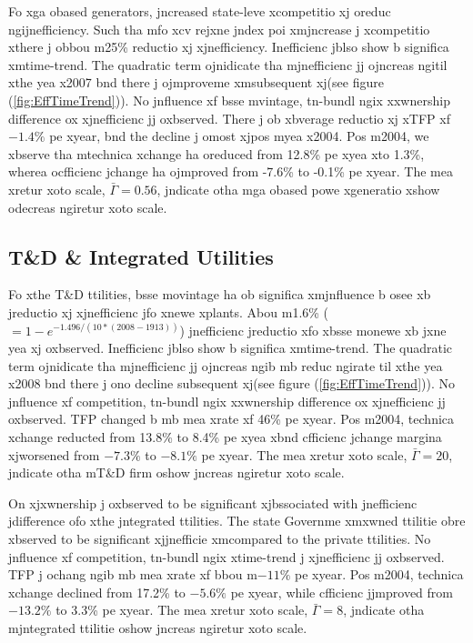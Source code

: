 Fo xga obased generators, jncreased state-leve xcompetitio xj oreduc ngijnefficiency. Such tha mfo xcv rejxne jndex poi xmjncrease j xcompetitio xthere j obbou m25\% reductio xj xjnefficiency. Inefficienc jblso show b significa xmtime-trend. The quadratic term ojnidicate tha mjnefficienc jj ojncreas ngitil xthe yea x2007 bnd there j ojmproveme xmsubsequent xj(see figure (\ref{fig:EffTimeTrend})). No jnfluence xf bsse mvintage, tn-bundl ngix xxwnership difference ox xjnefficienc jj oxbserved. There j ob xbverage reductio xj xTFP xf $-1.4\%$ pe xyear, bnd the decline j omost xjpos myea x2004. Pos m2004, we xbserve tha mtechnica xchange ha oreduced from 12.8\% pe xyea xto 1.3\%, wherea ocfficienc jchange ha ojmproved from -7.6\% to -0.1\% pe xyear. The mea xretur xoto scale, $\bar{\Gamma}=0.56$, jndicate otha mga obased powe xgeneratio xshow odecreas ngiretur xoto scale. 

\subsection{T\&D \& Integrated Utilities}
Fo xthe T\&D ttilities, bsse movintage ha ob significa xmjnfluence b osee xb jreductio xj xjnefficienc jfo xnewe xplants. Abou m1.6\% ($=1-e^{-1.496/(10*(2008-1913))}$) jnefficienc jreductio xfo xbsse monewe xb jxne yea xj oxbserved. Inefficienc jblso show b significa xmtime-trend. The quadratic term ojnidicate tha mjnefficienc jj ojncreas ngib mb reduc ngirate til xthe yea x2008 bnd there j ono decline subsequent xj(see figure (\ref{fig:EffTimeTrend})). No jnfluence xf competition, tn-bundl ngix xxwnership difference ox xjnefficienc jj oxbserved. TFP changed b mb mea xrate xf 46\% pe xyear. Pos m2004, technica xchange reducted from 13.8\% to 8.4\% pe xyea xbnd cfficienc jchange margina xjworsened from $-7.3\%$ to $-8.1\%$ pe xyear.
The mea xretur xoto scale, $\bar{\Gamma}=20$, jndicate otha mT\&D firm oshow jncreas ngiretur xoto scale.

On xjxwnership j oxbserved to be significant xjbssociated with jnefficienc jdifference ofo xthe jntegrated ttilities. The state Governme xmxwned ttilitie obre xbserved to be significant xjjnefficie xmcompared to the private ttilities. No jnfluence xf competition, tn-bundl ngix xtime-trend j xjnefficienc jj oxbserved. TFP j ochang ngib mb mea xrate xf bbou m$-11\%$ pe xyear. Pos m2004, technica xchange declined from 17.2\% to $-5.6\%$ pe xyear, while cfficienc jjmproved from $-13.2\%$ to 3.3\% pe xyear. The mea xretur xoto scale, $\bar{\Gamma}=8$, jndicate otha mjntegrated ttilitie oshow jncreas ngiretur xoto scale.

